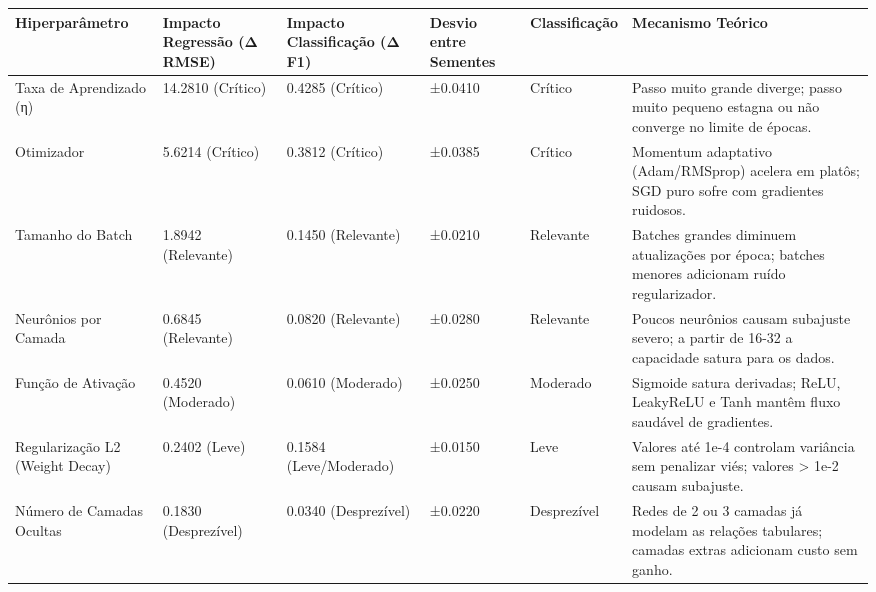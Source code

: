 \begin{tabular}{llllll}
\toprule
Hiperparâmetro & Impacto Regressão (Δ RMSE) & Impacto Classificação (Δ F1) & Desvio entre Sementes & Classificação & Mecanismo Teórico \\
\midrule
Taxa de Aprendizado (η) & 14.2810 (Crítico) & 0.4285 (Crítico) & ±0.0410 & Crítico & Passo muito grande diverge; passo muito pequeno estagna ou não converge no limite de épocas. \\
Otimizador & 5.6214 (Crítico) & 0.3812 (Crítico) & ±0.0385 & Crítico & Momentum adaptativo (Adam/RMSprop) acelera em platôs; SGD puro sofre com gradientes ruidosos. \\
Tamanho do Batch & 1.8942 (Relevante) & 0.1450 (Relevante) & ±0.0210 & Relevante & Batches grandes diminuem atualizações por época; batches menores adicionam ruído regularizador. \\
Neurônios por Camada & 0.6845 (Relevante) & 0.0820 (Relevante) & ±0.0280 & Relevante & Poucos neurônios causam subajuste severo; a partir de 16-32 a capacidade satura para os dados. \\
Função de Ativação & 0.4520 (Moderado) & 0.0610 (Moderado) & ±0.0250 & Moderado & Sigmoide satura derivadas; ReLU, LeakyReLU e Tanh mantêm fluxo saudável de gradientes. \\
Regularização L2 (Weight Decay) & 0.2402 (Leve) & 0.1584 (Leve/Moderado) & ±0.0150 & Leve & Valores até 1e-4 controlam variância sem penalizar viés; valores > 1e-2 causam subajuste. \\
Número de Camadas Ocultas & 0.1830 (Desprezível) & 0.0340 (Desprezível) & ±0.0220 & Desprezível & Redes de 2 ou 3 camadas já modelam as relações tabulares; camadas extras adicionam custo sem ganho. \\
\bottomrule
\end{tabular}
